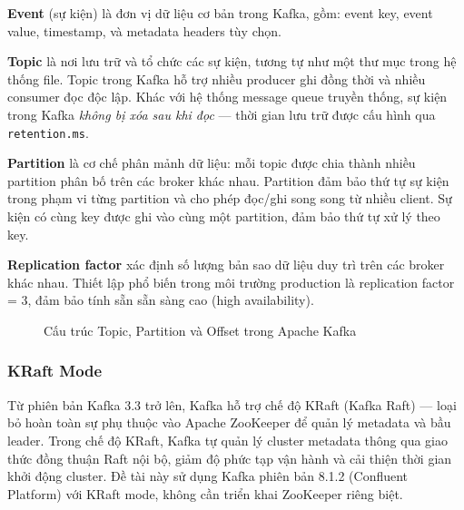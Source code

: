 \textbf{Event} (sự kiện) là đơn vị dữ liệu cơ bản trong Kafka, gồm: event key,
event value, timestamp, và metadata headers tùy chọn.

\textbf{Topic} là nơi lưu trữ và tổ chức các sự kiện, tương tự như một thư mục
trong hệ thống file. Topic trong Kafka hỗ trợ nhiều producer ghi đồng thời và
nhiều consumer đọc độc lập. Khác với hệ thống message queue truyền thống, sự kiện
trong Kafka \emph{không bị xóa sau khi đọc} --- thời gian lưu trữ được cấu hình
qua \texttt{retention.ms}.

\textbf{Partition} là cơ chế phân mảnh dữ liệu: mỗi topic được chia thành nhiều
partition phân bố trên các broker khác nhau. Partition đảm bảo thứ tự sự kiện trong
phạm vi từng partition và cho phép đọc/ghi song song từ nhiều client. Sự kiện có
cùng key được ghi vào cùng một partition, đảm bảo thứ tự xử lý theo key.

\textbf{Replication factor} xác định số lượng bản sao dữ liệu duy trì trên các
broker khác nhau. Thiết lập phổ biến trong môi trường production là replication
factor = 3, đảm bảo tính sẵn sẵn sàng cao (high availability).

\begin{figure}[H]
  \centering
  \setlength{\fboxsep}{12pt}
  \caption{Cấu trúc Topic, Partition và Offset trong Apache Kafka}
  \label{fig:kafka-topic}
\end{figure}

\subsubsection{KRaft Mode}

Từ phiên bản Kafka 3.3 trở lên, Kafka hỗ trợ chế độ KRaft (Kafka Raft) --- loại
bỏ hoàn toàn sự phụ thuộc vào Apache ZooKeeper để quản lý metadata và bầu leader.
Trong chế độ KRaft, Kafka tự quản lý cluster metadata thông qua giao thức đồng thuận
Raft nội bộ, giảm độ phức tạp vận hành và cải thiện thời gian khởi động cluster.
Đề tài này sử dụng Kafka phiên bản 8.1.2 (Confluent Platform) với KRaft mode, không
cần triển khai ZooKeeper riêng biệt.

